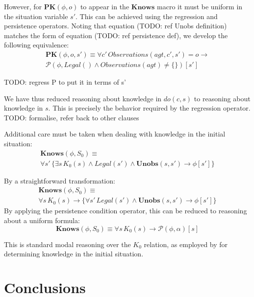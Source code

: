 \documentclass[letterpaper]{article}
\begin{document}
However, for $\mathbf{PK}(\phi,o)$ to appear in the $\mathbf{Knows}$
macro it must be uniform in the situation variable $s'$. This can
be achieved using the regression and persistence operators. Noting
that equation (TODO: ref Unobs definition) matches the form of equation
(TODO: ref persistence def), we develop the following equivalence:
\begin{multline}
\mathbf{PK}(\phi,o,s')\equiv\forall c'\, Observations(agt,c',s')=o\rightarrow\\
\mathcal{P}(\phi,Legal()\wedge Observations(agt)\neq\{\})[s']
\end{multline}

TODO: regress P to put it in terms of s'

We have thus reduced reasoning about knowledge in $do(c,s)$ to reasoning
about knowledge in $s$. This is precisely the behavior required by
the regression operator. TODO: formalise, refer back to other clauses

Additional care must be taken when dealing with knowledge in the initial
situation:
\begin{multline}
\mathbf{Knows}(\phi,S_{0})\equiv\\
\forall s'\,\{\exists s\, K_{0}(s)\wedge Legal(s')\wedge\mathbf{Unobs}(s,s')\rightarrow\phi[s']\}
\end{multline}

By a straightforward transformation:
\begin{multline}
\mathbf{Knows}(\phi,S_{0})\equiv\\
\forall s\, K_{0}(s)\rightarrow\{\forall s'\, Legal(s')\wedge\mathbf{Unobs}(s,s')\rightarrow\phi[s']\}
\end{multline}
By applying the persistence condition operator, this can be reduced to reasoning
about a uniform formula:
\begin{equation}
\mathbf{Knows}(\phi,S_{0})\equiv\forall s\, K_{0}(s)\rightarrow\mathcal{P}(\phi,\alpha)[s]
\end{equation}

This is standard modal reasoning over the $K_{0}$ relation, as employed
by \cite{scherl03sc_knowledge} for determining knowledge in the initial
situation.

\section{Conclusions}
\end{document}
